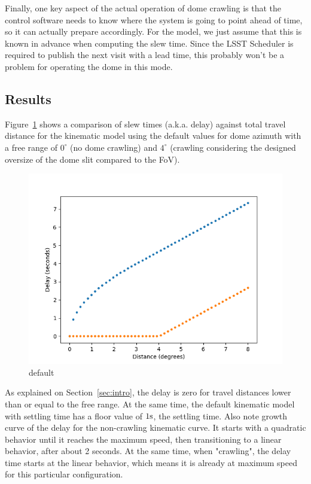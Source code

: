 \documentclass[TS,lsstdraft,toc,usenatbib]{lsstdoc}
\begin{document}
Finally, one key aspect of the actual operation of dome crawling is that the control software needs to know where the system is going to point ahead of time, so it can actually prepare accordingly. For the model, we just assume that this is known in advance when computing the slew time. Since the LSST Scheduler is required to publish the next visit with a lead time, this probably won't be a problem for operating the dome in this mode. 

\subsection{Results}

Figure~\ref{fig:comparison} shows a comparison of slew times (a.k.a. delay) against total travel distance for the kinematic model using the default values for dome azimuth with a free range of $0^\circ$ (no dome crawling) and $4^\circ$ (crawling considering the designed oversize of the dome slit compared to the FoV). 

\begin{figure}[htbp]
\begin{center}
\includegraphics[width=0.8\columnwidth]{images/figure_1}
\caption{default}
\label{fig:comparison}
\end{center}
\end{figure}

As explained on Section~\ref{sec:intro}, the delay is zero for travel distances lower than or equal to the free range. At the same time, the default kinematic model with settling time has a floor value of $1 \rm s$, the settling time. Also note growth curve of the delay for the non-crawling kinematic curve. It starts with a quadratic behavior until it reaches the maximum speed, then transitioning to a linear behavior, after about 2 seconds. At the same time, when "crawling", the delay time starts at the linear behavior, which means it is already at maximum speed for this particular configuration. 
\end{document}
